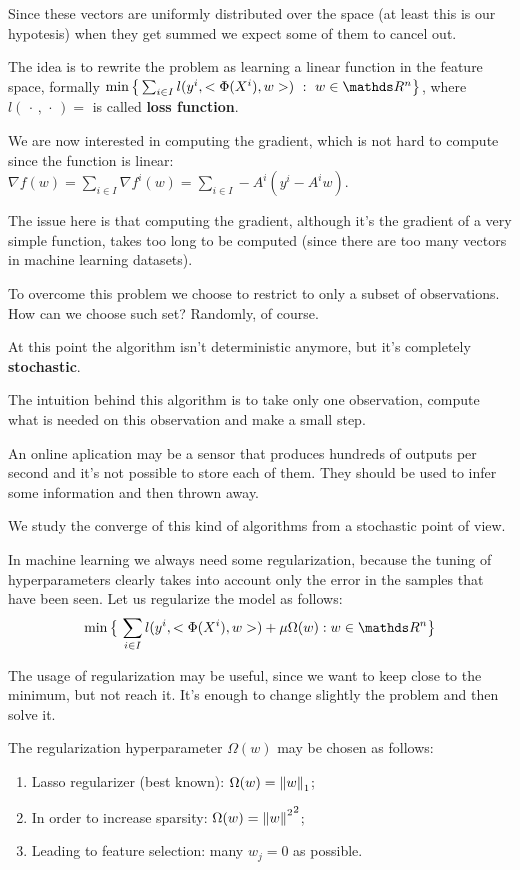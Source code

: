 \documentclass[ComputationalMathematics.tex]{subfiles}
\begin{document}
Since these vectors are uniformly distributed over the space (at least this is our hypotesis) when they get summed we expect some of them to cancel out.

The idea is to rewrite the problem as learning a linear function in the feature space, formally $\min \big\{\sum_{i \in I} l(y^i,\ps{\Phi(X^i)}{w})~:~w \in \R^n \big\}$, where $l( \, \cdot \,,\, \cdot \, ) =$ is called \textbf{loss function}.

We are now interested in computing the gradient, which is not hard to compute since the function is linear: $\nabla f(w) = \sum_{i \in I} \nabla f^i(w) = \sum_{i \in I} -A^i (y^i - A^i w)$.

The issue here is that computing the gradient, although it's the gradient of a very simple function, takes too long to be computed (since there are too many vectors in machine learning datasets).

To overcome this problem we choose to restrict to only a subset of observations. How can we choose such set? Randomly, of course.

At this point the algorithm isn't deterministic anymore, but it's completely \textbf{stochastic}.

The intuition behind this algorithm is to take only one observation, compute what is needed on this observation and make a small step.

An online aplication may be a sensor that produces hundreds of outputs per second and it's not possible to store each of them. They should be used to infer some information and then thrown away.

We study the converge of this kind of algorithms from a stochastic point of view.

In machine learning we always need some regularization, because the tuning of hyperparameters clearly takes into account only the error in the samples that have been seen. Let us regularize the model as follows:
\[
  \min \big\{ \, \sum\limits_{i \in I} l(y^i, \ps{\Phi(X^i)}{w}) + \mu \Omega(w) : w \in \R^n \big\}
\]

The usage of regularization may be useful, since we want to keep close to the minimum, but not reach it. It's enough to change slightly the problem and then solve it.

The regularization hyperparameter $\Omega(w)$ may be chosen as follows:

\begin{enumerate}
  \item Lasso regularizer (best known): $\Omega(w) = {\left\lVert w\right\rVert}_1$;
  \item In order to increase sparsity: $\Omega(w) = {{\left\lVert w\right\rVert}^2}^2$;
  \item Leading to feature selection: many $w_j = 0$ as possible.
\end{enumerate}
\end{document}
